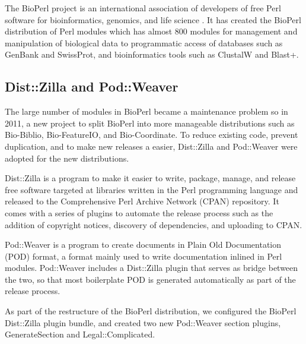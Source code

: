 The BioPerl project is an international association of developers of
free Perl software for bioinformatics, genomics, and life science
\citep{bioperl}.  It has created the BioPerl distribution of Perl
modules which has almost 800 modules for management and manipulation
of biological data to programmatic access of databases such as GenBank
and SwissProt, and bioinformatics tools such as ClustalW and Blast+.


\subsection{Dist::Zilla and Pod::Weaver}

The large number of modules in BioPerl became a maintenance problem
so in 2011, a new project to split BioPerl into
more manageable distributions such as Bio-Biblio, Bio-FeatureIO, and
Bio-Coordinate.  To reduce existing code, prevent duplication,
and to make new releases
a easier, Dist::Zilla and Pod::Weaver were adopted for
the new distributions.

Dist::Zilla is a program to make it easier to write, package, manage,
and release free software targeted at libraries written in the Perl
programming language and released to the Comprehensive Perl Archive
Network (CPAN) repository.  It comes with a series of plugins to automate the
release process such as the addition of copyright notices, discovery
of dependencies, and uploading to CPAN.

Pod::Weaver is a program to create documents in Plain Old
Documentation (POD) format, a format mainly used to write
documentation inlined in Perl modules.
Pod::Weaver includes a Dist::Zilla plugin
that serves as bridge between the two, so that most boilerplate POD is
generated automatically as part of the release process.

As part of the restructure of the BioPerl distribution, we configured
the BioPerl Dist::Zilla plugin bundle, and created two new Pod::Weaver
section plugins, GenerateSection and Legal::Complicated.

